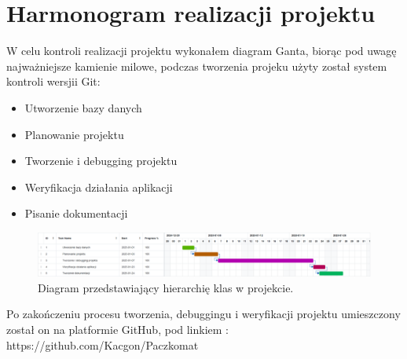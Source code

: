 \chapter{Harmonogram realizacji projektu}

W celu kontroli realizacji projektu wykonałem diagram Ganta, biorąc pod uwagę najważniejsze kamienie milowe, podczas tworzenia projeku użyty został system kontroli wersjii Git:
\begin{itemize}
  \item Utworzenie bazy danych 
  \item Planowanie projektu 
  \item Tworzenie i debugging projektu 
  \item Weryfikacja działania aplikacji
  \item Pisanie dokumentacji
\end{itemize}

\begin{figure}[h!]
    \centering
    \includegraphics[width=1.2\textwidth]{Diagram Ganta projekt.png}
    \caption{Diagram przedstawiający hierarchię klas w projekcie.}
\end{figure}

Po zakończeniu procesu tworzenia, debuggingu i weryfikacji projektu umieszczony został on na platformie GitHub, pod linkiem : https://github.com/Kacgon/Paczkomat
